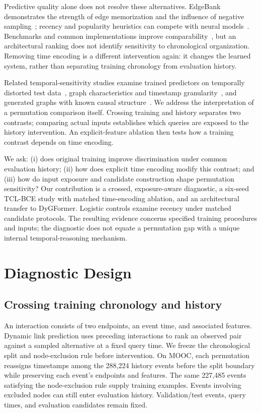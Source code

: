 \documentclass[sigconf,anonymous,review]{acmart}
\begin{document}
Predictive quality alone does not resolve these alternatives. EdgeBank demonstrates the strength of edge memorization and the influence of negative sampling~\cite{poursafaei2022towards}; recency and popularity heuristics can compete with neural models~\cite{cornell2025heuristics}. Benchmarks and common implementations improve comparability~\cite{tgb2023,yu2023dygformer}, but an architectural ranking does not identify sensitivity to chronological organization. Removing time encoding is a different intervention again: it changes the learned system, rather than separating training chronology from evaluation history.

Related temporal-sensitivity studies examine trained predictors on temporally distorted test data~\cite{rahman2025counterfactual}, graph characteristics and timestamp granularity~\cite{hayes2025learn}, and generated graphs with known causal structure~\cite{rahman2026causal}. We address the interpretation of a permutation comparison itself. Crossing training and history separates two contrasts; comparing actual inputs establishes which queries are exposed to the history intervention. An explicit-feature ablation then tests how a training contrast depends on time encoding.

We ask: (i) does original training improve discrimination under common evaluation history; (ii) how does explicit time encoding modify this contrast; and (iii) how do input exposure and candidate construction shape permutation sensitivity? Our contribution is a crossed, exposure-aware diagnostic, a six-seed TCL-BCE study with matched time-encoding ablation, and an architectural transfer to DyGFormer. Logistic controls examine recency under matched candidate protocols. The resulting evidence concerns specified training procedures and inputs; the diagnostic does not equate a permutation gap with a unique internal temporal-reasoning mechanism.

\section{Diagnostic Design}
\subsection{Crossing training chronology and history}
An interaction consists of two endpoints, an event time, and associated features. Dynamic link prediction uses preceding interactions to rank an observed pair against a sampled alternative at a fixed query time. We freeze the chronological split and node-exclusion rule before intervention. On MOOC, each permutation reassigns timestamps among the 288,224 history events before the split boundary while preserving each event's endpoints and features. The same 227,485 events satisfying the node-exclusion rule supply training examples. Events involving excluded nodes can still enter evaluation history. Validation/test events, query times, and evaluation candidates remain fixed.
\end{document}
